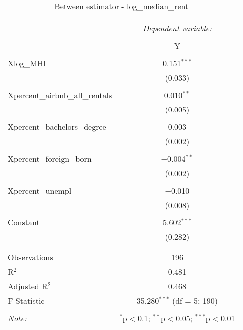 \documentclass{article}
\begin{document}
\begin{table}[!htbp] \centering 
  \caption{Between estimator - log\_median\_rent} 
  \label{} 
  \begin{tabular}{@{\extracolsep{5pt}}lc} 
    \\[-1.8ex]\hline 
    \hline \\[-1.8ex] 
    & \multicolumn{1}{c}{\textit{Dependent variable:}} \\ 
    \cline{2-2} 
    \\[-1.8ex] & Y \\ 
    \hline \\[-1.8ex] 
    Xlog\_MHI & 0.151$^{***}$ \\ 
    & (0.033) \\ 
    & \\ 
    Xpercent\_airbnb\_all\_rentals & 0.010$^{**}$ \\ 
    & (0.005) \\ 
    & \\ 
    Xpercent\_bachelors\_degree & 0.003 \\ 
    & (0.002) \\ 
    & \\ 
    Xpercent\_foreign\_born & $-$0.004$^{**}$ \\ 
    & (0.002) \\ 
    & \\ 
    Xpercent\_unempl & $-$0.010 \\ 
    & (0.008) \\ 
    & \\ 
    Constant & 5.602$^{***}$ \\ 
    & (0.282) \\ 
    & \\ 
    \hline \\[-1.8ex] 
    Observations & 196 \\ 
    R$^{2}$ & 0.481 \\ 
    Adjusted R$^{2}$ & 0.468 \\ 
    F Statistic & 35.280$^{***}$ (df = 5; 190) \\ 
    \hline 
    \hline \\[-1.8ex] 
    \textit{Note:}  & \multicolumn{1}{r}{$^{*}$p$<$0.1; $^{**}$p$<$0.05; $^{***}$p$<$0.01} \\ 
  \end{tabular} 
\end{table} 
\end{document}
